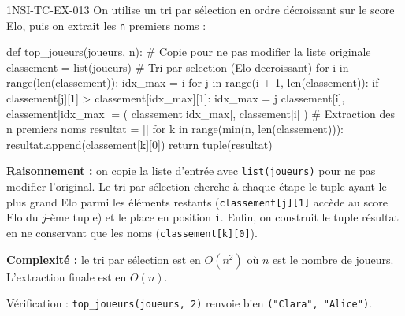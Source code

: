 \begin{corrige}{1NSI-TC-EX-013}
On utilise un tri par sélection en ordre décroissant sur le score Elo, puis on extrait les \lstinline{n} premiers noms :

\begin{python}
def top_joueurs(joueurs, n):
    # Copie pour ne pas modifier la liste originale
    classement = list(joueurs)
    # Tri par selection (Elo decroissant)
    for i in range(len(classement)):
        idx_max = i
        for j in range(i + 1, len(classement)):
            if classement[j][1] > classement[idx_max][1]:
                idx_max = j
        classement[i], classement[idx_max] = (
            classement[idx_max], classement[i]
        )
    # Extraction des n premiers noms
    resultat = []
    for k in range(min(n, len(classement))):
        resultat.append(classement[k][0])
    return tuple(resultat)
\end{python}

\textbf{Raisonnement :} on copie la liste d'entrée avec \lstinline{list(joueurs)} pour ne pas modifier l'original. Le tri par sélection cherche à chaque étape le tuple ayant le plus grand Elo parmi les éléments restants (\lstinline{classement[j][1]} accède au score Elo du $j$-ème tuple) et le place en position \lstinline{i}. Enfin, on construit le tuple résultat en ne conservant que les noms (\lstinline{classement[k][0]}).

\textbf{Complexité :} le tri par sélection est en $O(n^2)$ où $n$ est le nombre de joueurs. L'extraction finale est en $O(n)$.

Vérification : \lstinline{top_joueurs(joueurs, 2)} renvoie bien \lstinline{("Clara", "Alice")}.
\end{corrige}
